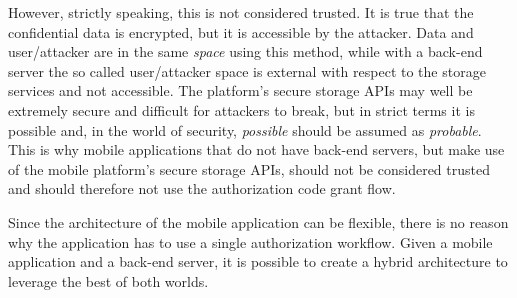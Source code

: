 However, strictly speaking, this is not considered trusted. It is true that the confidential data is encrypted, but it is accessible by the attacker. Data and user/attacker are in the same \textit{space} using this method, while with a back-end server the so called user/attacker space is external with respect to the storage services and not accessible. The platform's secure storage APIs may well be extremely secure and difficult for attackers to break, but in strict terms it is possible and, in the world of security, \textit{possible} should be assumed as \textit{probable}. This is why mobile applications that do not have back-end servers, but make use of the mobile platform's secure storage APIs, should not be considered trusted and should therefore not use the authorization code grant flow.

Since the architecture of the mobile application can be flexible, there is no reason why the application has to use a single authorization workflow. Given a mobile application and a back-end server, it is possible to create a hybrid architecture to leverage the best of both worlds.

